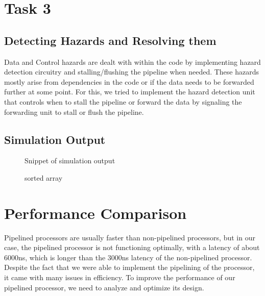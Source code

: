 \documentclass[12pt]{article}
\begin{document}
\section{Task 3}\label{task3}
\subsection{Detecting Hazards and Resolving them}\label{hazards}
   Data and Control hazards are dealt with within the code by implementing hazard detection circuitry and stalling/flushing the pipeline when needed. These hazards mostly arise from dependencies in the code or if the data needs to be forwarded further at some point. For this, we tried to implement the hazard detection unit that controls when to stall the pipeline or forward the data by signaling the forwarding unit to stall or flush the pipeline.

\newpage
\subsection{Simulation Output}\label{code3}

    \begin{figure}[htbp!]
        \centering
        \caption{Snippet of simulation output}
    \end{figure}
    \begin{figure}[htbp!]
        \centering
        \caption{sorted array}
    \end{figure}

\section{Performance Comparison}\label{performance}
    Pipelined processors are usually faster than non-pipelined processors, but in our case, the pipelined processor is not functioning optimally, with a latency of about 6000ns, which is longer than the 3000ns latency of the non-pipelined processor. Despite the fact that we were able to implement the pipelining of the processor, it came with many issues in efficiency. To improve the performance of our pipelined processor, we need to analyze and optimize its design.
\end{document}
